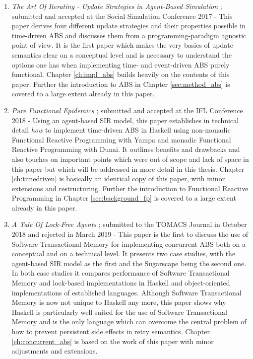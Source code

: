 \begin{enumerate}
	\item \textit{The Art Of Iterating - Update Strategies in Agent-Based Simulation} \cite{thaler_art_2017}; submitted and accepted at the Social Simulation Conference 2017 - This paper derives four different update strategies and their properties possible in time-driven ABS and discusses them from a programming-paradigm agnostic point of view. It is the first paper which makes the very basics of update semantics clear on a conceptual level and is necessary to understand the options one has when implementing time- and event-driven ABS purely functional. Chapter \ref{ch:impl_abs} builds heavily on the contents of this paper. Further the introduction to ABS in Chapter \ref{sec:method_abs} is covered to a large extent already in this paper.
	
	\item \textit{Pure Functional Epidemics} \cite{thaler_pure_2018}; submitted and accepted at the IFL Conference 2018 - Using an agent-based SIR model, this paper establishes in technical detail \textit{how} to implement time-driven ABS in Haskell using non-monadic Functional Reactive Programming with Yampa and monadic Functional Reactive Programming with Dunai. It outlines benefits and drawbacks and also touches on important points which were out of scope and lack of space in this paper but which will be addressed in more detail in this thesis. Chapter \ref{ch:timedriven} is basically an identical copy of this paper, with minor extensions and restructuring. Further the introduction to Functional Reactive Programming in Chapter \ref{sec:background_fp} is covered to a large extent already in this paper.
	
	\item \textit{A Tale Of Lock-Free Agents} \cite{thaler_tale_2018}; submitted to the TOMACS Journal in October 2018 and rejected in March 2019 - This paper is the first to discuss the use of Software Transactional Memory for implementing concurrent ABS both on a conceptual and on a technical level. It presents two case studies, with the agent-based SIR model as the first and the Sugarscape being the second one. In both case studies it compares performance of Software Transactional Memory and lock-based implementations in Haskell and object-oriented implementations of established languages. Although Software Transactional Memory is now not unique to Haskell any more, this paper shows why Haskell is particularly well suited for the use of Software Transactional Memory and is the only language which can overcome the central problem of how to prevent persistent side effects in retry semantics. Chapter \ref{ch:concurrent_abs} is based on the work of this paper with minor adjustments and extensions.


\end{enumerate}
